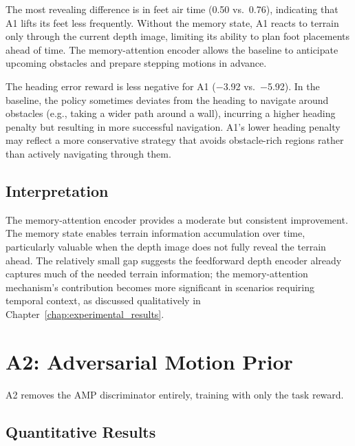 The most revealing difference is in feet air time (0.50 vs.\ 0.76), indicating that A1 lifts its feet less frequently. Without the memory state, A1 reacts to terrain only through the current depth image, limiting its ability to plan foot placements ahead of time. The memory-attention encoder allows the baseline to anticipate upcoming obstacles and prepare stepping motions in advance.

The heading error reward is less negative for A1 ($-$3.92 vs.\ $-$5.92). In the baseline, the policy sometimes deviates from the heading to navigate around obstacles (e.g., taking a wider path around a wall), incurring a higher heading penalty but resulting in more successful navigation. A1's lower heading penalty may reflect a more conservative strategy that avoids obstacle-rich regions rather than actively navigating through them.

\subsection{Interpretation}

The memory-attention encoder provides a moderate but consistent improvement. The memory state enables terrain information accumulation over time, particularly valuable when the depth image does not fully reveal the terrain ahead. The relatively small gap suggests the feedforward depth encoder already captures much of the needed terrain information; the memory-attention mechanism's contribution becomes more significant in scenarios requiring temporal context, as discussed qualitatively in Chapter~\ref{chap:experimental_results}.

\section{A2: Adversarial Motion Prior}
\label{sec:ablation_amp}

A2 removes the AMP discriminator entirely, training with only the task reward.

\subsection{Quantitative Results}

